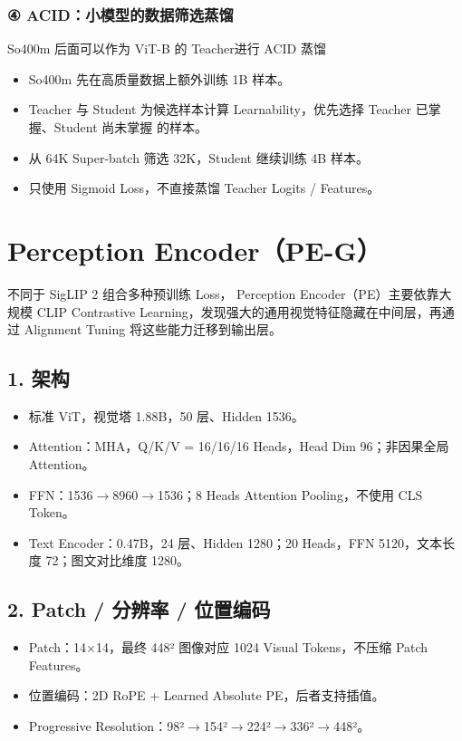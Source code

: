 \subsubsection{{④} ACID：小模型的数据筛选蒸馏}
So400m 后面可以作为 ViT-\allowbreak{}B 的 Teacher进行 ACID 蒸馏\par
\begin{itemize}
\item So400m 先在高质量数据上额外训练 1B 样本。
\item Teacher 与 Student 为候选样本计算 Learnability，优先选择 Teacher 已掌握、Student 尚未掌握 的样本。
\item 从 64K Super-\allowbreak{}batch 筛选 32K，Student 继续训练 4B 样本。
\item 只使用 Sigmoid Loss，不直接蒸馏 Teacher Logits /\allowbreak{} Features。
\end{itemize}
\clearpage
{}
\section{Perception Encoder（PE-\allowbreak{}G）}
不同于 SigLIP 2 组合多种预训练 Loss， Perception Encoder（PE）主要依靠大规模 CLIP Contrastive Learning，发现强大的通用视觉特征隐藏在中间层，再通过 Alignment Tuning 将这些能力迁移到输出层。\par
{}
\subsection{1.\allowbreak{} 架构}
\begin{itemize}
\item 标准 ViT，视觉塔 1.\allowbreak{}88B，50 层、Hidden 1536。
\item Attention：MHA，Q/\allowbreak{}K/\allowbreak{}V =\allowbreak{} 16/\allowbreak{}16/\allowbreak{}16 Heads，Head Dim 96；非因果全局 Attention。
\item FFN：1536\(\rightarrow\)8960\(\rightarrow\)1536；8 Heads Attention Pooling，不使用 CLS Token。
\item Text Encoder：0.\allowbreak{}47B，24 层、Hidden 1280；20 Heads，FFN 5120，文本长度 72；图文对比维度 1280。
\end{itemize}
\subsection{2.\allowbreak{} Patch /\allowbreak{} 分辨率 /\allowbreak{} 位置编码}
\begin{itemize}
\item Patch：14\(\times\)14，最终 448² 图像对应 1024 Visual Tokens，不压缩 Patch Features。
\item 位置编码：2D RoPE + Learned Absolute PE，后者支持插值。
\item Progressive Resolution：98²\(\rightarrow\)154²\(\rightarrow\)224²\(\rightarrow\)336²\(\rightarrow\)448²。
\end{itemize}
